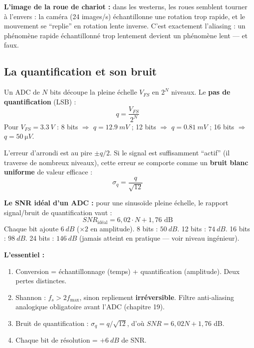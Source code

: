 \documentclass[12pt,a4paper,twoside]{book}
\begin{document}
\begin{intuition}
\textbf{L'image de la roue de chariot :} dans les westerns, les roues semblent tourner à l'envers : la caméra (24 images/s) échantillonne une rotation trop rapide, et le mouvement se ``replie'' en rotation lente inverse. C'est exactement l'aliasing : un phénomène rapide échantillonné trop lentement devient un phénomène lent --- et faux.
\end{intuition}

\subsection{La quantification et son bruit}

\begin{formule}
Un ADC de $N$ bits découpe la pleine échelle $V_{FS}$ en $2^N$ niveaux. Le \textbf{pas de quantification} (LSB) :
\[
q = \frac{V_{FS}}{2^N}
\]
Pour $V_{FS} = \SI{3.3}{V}$ : 8 bits $\Rightarrow$ $q = \SI{12.9}{mV}$ ; 12 bits $\Rightarrow$ $q = \SI{0.81}{mV}$ ; 16 bits $\Rightarrow$ $q = \SI{50}{\micro V}$.

L'erreur d'arrondi est au pire $\pm q/2$. Si le signal est suffisamment ``actif'' (il traverse de nombreux niveaux), cette erreur se comporte comme un \textbf{bruit blanc uniforme} de valeur efficace :
\[
\boxed{\sigma_q = \frac{q}{\sqrt{12}}}
\]
\end{formule}

\begin{formule}
\textbf{Le SNR idéal d'un ADC :} pour une sinusoïde pleine échelle, le rapport signal/bruit de quantification vaut :
\[
\boxed{SNR_{\text{idéal}} = 6{,}02 \cdot N + 1{,}76 \text{ dB}}
\]
Chaque bit ajoute $\SI{6}{dB}$ ($\times 2$ en amplitude). 8 bits : $\SI{50}{dB}$. 12 bits : $\SI{74}{dB}$. 16 bits : $\SI{98}{dB}$. 24 bits : $\SI{146}{dB}$ (jamais atteint en pratique --- voir niveau ingénieur).
\end{formule}

\begin{retenir}
\textbf{L'essentiel :}
\begin{enumerate}[nosep]
\item Conversion = échantillonnage (temps) + quantification (amplitude). Deux pertes distinctes.
\item Shannon : $f_s > 2 f_{\max}$, sinon repliement \textbf{irréversible}. Filtre anti-aliasing analogique obligatoire avant l'ADC (chapitre 19).
\item Bruit de quantification : $\sigma_q = q/\sqrt{12}$, d'où $SNR = 6{,}02N + 1{,}76$ dB.
\item Chaque bit de résolution = $+\SI{6}{dB}$ de SNR.
\end{enumerate}
\end{retenir}
\end{document}
